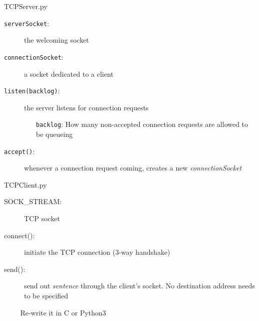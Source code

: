 \begin{frame}{TCPServer.py}
  \begin{minipage}{.5\linewidth}
  \end{minipage}\hfill
  \begin{minipage}{.47\linewidth}
    \footnotesize
    \begin{description}
    \item[\texttt{serverSocket}:] the welcoming socket
    \item[\texttt{connectionSocket}:] a socket dedicated to a client
    \item[\texttt{listen(backlog)}:] the server listens for connection requests
      \begin{itemize}\scriptsize
      \item[\texttt{backlog}:] How many non-accepted connection requests
          are allowed to be queueing
      \end{itemize}
    \item[\texttt{accept()}:] whenever a connection request coming, creates a new
      \emph{connectionSocket}
    \end{description}
  \end{minipage}
\end{frame}

\begin{frame}{TCPClient.py}
  \begin{minipage}{.5\linewidth}
  \end{minipage}\hfill
  \begin{minipage}{.47\linewidth}
    \begin{description}
    \item[SOCK\_STREAM:] TCP socket
    \item[connect():] initiate the TCP connection (3-way handshake)
    \item[send():] send out \emph{sentence} through the client's socket. No
      destination address needs to be specified
    \end{description}
  \end{minipage}
  \begin{itemize}
  \item[] Re-write it in C or Python3
  \end{itemize}
\end{frame}

